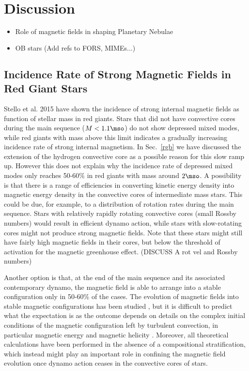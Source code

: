 \section{Discussion}
\begin{itemize}
\item Role of magnetic fields in shaping Planetary Nebulae
\item OB stars (Add refs to FORS, MIMEs...)
\end{itemize}

\subsection{Incidence Rate of Strong Magnetic Fields in Red Giant Stars}
Stello et al. 2015 have shown the incidence of strong internal magnetic fields as function of stellar mass in red giants. Stars that did not have convective cores during the main sequence ($M<1.1\mso$) do not show depressed mixed modes, while red giants with mass above this limit indicates a gradually increasing incidence rate of strong internal magnetism.    In Sec.~\ref{rgb} we have discussed the extension of the hydrogen convective core as a possible reason for this slow ramp up. However this does not explain why the incidence rate of depressed mixed modes only reaches 50-60\% in red giants with mass around $2\mso$.
A possibility is that there is a range of efficiencies in converting kinetic energy density into magnetic energy density in the convective cores of intermediate mass stars. This could be due, for example, to a distribution of rotation rates during the main sequence. Stars with relatively rapidly rotating convective cores (small Rossby numbers) would result in efficient dynamo action, while stars with slow-rotating cores might not produce strong magnetic fields. Note that these stars  might still have fairly high magnetic fields in their cores, but below the threshold of activation for the magnetic greenhouse effect.
(DISCUSS A rot vel and Rossby numbers)

Another option is that, at the end of the main sequence and its associated contemporary dynamo, the magnetic field is able to arrange into a stable configuration only in 50-60\% of the cases. The evolution of magnetic fields into stable magnetic configurations has been studied \citep{Braithwaite_2006}, but it is difficult to predict what the expectation is as the outcome depends on details on the complex initial conditions of the magnetic configuration left by turbulent convection, in particular magnetic energy and magnetic helicity \citep{Braithwaite_2008}. Moreover, all theoretical calculations have been performed in the absence of a compositional stratification, which instead might play an important role in confining the magnetic field evolution once dynamo action ceases in the convective cores of stars. 